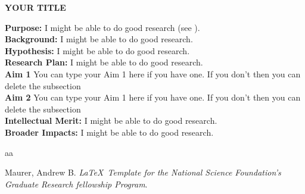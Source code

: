 \documentclass[12pt]{article}
\begin{document}
\begin{center}
\large{\bf YOUR TITLE} \\
\end{center}
\noindent
\textbf{Purpose:} I might be able to do good research (see \cite{amau}).\\

\noindent
\textbf{Background:} I might be able to do good research.\\

\noindent
\textbf{Hypothesis:} I might be able to do good research.\\

\noindent
\textbf{Research Plan:} I might be able to do good research.\\
\textbf{Aim 1} You can type your Aim 1 here if you have one. If you don't then you can delete the subsection\\ 
\textbf{Aim 2} You can type your Aim 1 here if you have one. If you don't then you can delete the subsection\\ 

\noindent
\textbf{Intellectual Merit:} I might be able to do good research.\\


\noindent
\textbf{Broader Impacts:} I might be able to do good research.\\


\footnotesize
\begin{thebibliography}{aa}

 Maurer, Andrew B. \emph{\LaTeX \ Template for the National Science Foundation's Graduate Research fellowship Program}.

\end{thebibliography}
\end{document}

